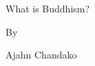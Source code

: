 \null
\vspace{3em}
{\HUGE What is Buddhism? \par}
\vspace{3em}
{\LARGE By \par}
\vspace{0.5em}
{\LARGE Ajahn Chandako \par}
